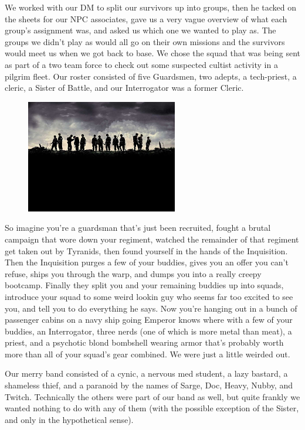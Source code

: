 We worked with our DM to split our survivors up into groups, then he tacked on the sheets for our NPC associates, gave us a very vague overview of what each group's assignment was, and asked us which one we wanted to play as. 
The groups we didn't play as would all go on their own missions and the survivors would meet us when we got back to base. 
We chose the squad that was being sent as part of a two team force to check out some suspected cultist activity in a pilgrim fleet. 
Our roster consisted of five Guardsmen, two adepts, a tech-priest, a cleric, a Sister of Battle, and our Interrogator was a former Cleric.


\begin{figure}
	\begin{center}
		\includegraphics[width=\figwidth]{pics/2/4.png}
	\end{center}
\end{figure}
So imagine you're a guardsman that's just been recruited, fought a brutal campaign that wore down your regiment, watched the remainder of that regiment get taken out by Tyranids, then found yourself in the hands of the Inquisition. 
Then the Inquisition purges a few of your buddies, gives you an offer you can't refuse, ships you through the warp, and dumps you into a really creepy bootcamp.
Finally they split you and your remaining buddies up into squads, introduce your squad to some weird lookin guy who seems far too excited to see you, and tell you to do everything he says. 
Now you're hanging out in a bunch of passenger cabins on a navy ship going Emperor knows where with a few of your buddies, an Interrogator, three nerds (one of which is more metal than meat), a priest, and a psychotic blond bombshell wearing armor that's probably worth more than all of your squad's gear combined.
We were just a little weirded out.

Our merry band consisted of a cynic, a nervous med student, a lazy bastard, a shameless thief, and a paranoid by the names of  Sarge, Doc, Heavy, Nubby, and Twitch.
Technically the others were part of our band as well, but quite frankly we wanted nothing to do with any of them (with the possible exception of the Sister, and only in the hypothetical sense).


